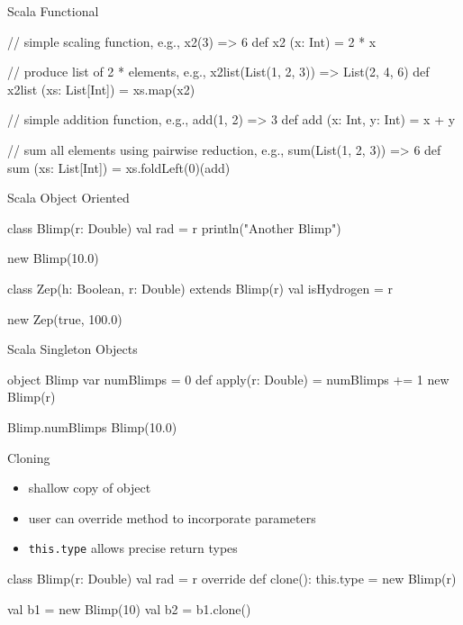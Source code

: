\documentclass[xcolor=pdflatex,dvipsnames,table]{beamer}
\begin{document}
\begin{frame}[fragile]{Scala Functional}
\begin{scala}
// simple scaling function, e.g., x2(3) => 6
def x2 (x: Int) = 2 * x
\end{scala}

\begin{scala}
// produce list of 2 * elements, e.g., x2list(List(1, 2, 3)) => List(2, 4, 6)
def x2list (xs: List[Int]) = xs.map(x2)
\end{scala}

\begin{scala}
// simple addition function, e.g., add(1, 2) => 3
def add (x: Int, y: Int) = x + y
\end{scala}

\begin{scala}
// sum all elements using pairwise reduction, e.g., sum(List(1, 2, 3)) => 6
def sum (xs: List[Int]) = xs.foldLeft(0)(add)
\end{scala}
\end{frame}

\begin{frame}[fragile]{Scala Object Oriented}

\begin{scala}
class Blimp(r: Double) {
  val rad = r
  println("Another Blimp")
}

new Blimp(10.0)

class Zep(h: Boolean, r: Double) extends Blimp(r) {
  val isHydrogen = r
}

new Zep(true, 100.0)
\end{scala}

\end{frame}

\begin{frame}[fragile]{Scala Singleton Objects}

\begin{scala}
object Blimp {
  var numBlimps = 0
  def apply(r: Double) = {
    numBlimps += 1
    new Blimp(r)
  }
}

Blimp.numBlimps
Blimp(10.0)
\end{scala}

\end{frame}

\begin{frame}[fragile]{Cloning}
\begin{itemize}
\item shallow copy of object
\item user can override method to incorporate parameters
\item \verb+this.type+ allows precise return types
\end{itemize}
\begin{scala}
class Blimp(r: Double) {
  val rad = r
  override def clone(): this.type = new Blimp(r)
}

val b1 = new Blimp(10)
val b2 = b1.clone()
\end{scala}
\end{frame}
\end{document}
